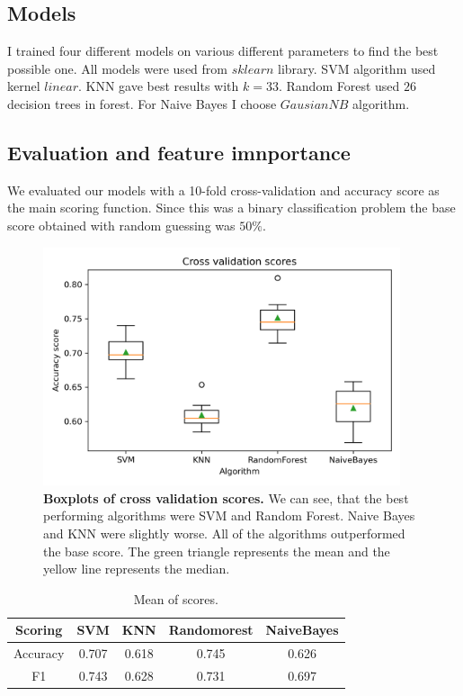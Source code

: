 \documentclass[fleqn,moreauthors,10pt]{ds_report}
\begin{document}
\subsection{Models}
I trained four different models on various different parameters to find the best possible one. All models were used from $sklearn$ library. SVM algorithm used kernel $linear$. KNN gave best results with $k=33$. Random Forest used $26$ decision trees in forest. For Naive Bayes I choose $GausianNB$ algorithm.

\subsection{Evaluation and feature imnportance}
We evaluated our models with a 10-fold cross-validation and accuracy score as the main scoring function. Since this was a binary classification problem the base score obtained with random guessing was $50\%$.


\begin{figure}[h]\centering
	\includegraphics[width=\linewidth, height=7cm]{problem_1_boxplot.png}
	
	\caption{\textbf{Boxplots of cross validation scores.} We can see, that the best performing algorithms were SVM and Random Forest. Naive Bayes and KNN were slightly worse. All of the algorithms outperformed the base score.  The green triangle represents the mean and the yellow line represents the median. }
	\label{boxplot1}
\end{figure}


\begin{center}
\begin{table}
\caption{\label{table_1} Mean of scores.}

\begin{tabular}{|c|| c| c| c| c|} 
 \hline
 Scoring  & SVM & KNN & Randomorest  & NaiveBayes\\ 
 \hline\hline
 Accuracy & 0.707 & 0.618 &  0.745 & 0.626\\ 
 \hline
 F1 & 0.743 & 0.628 & 0.731 & 0.697 \\
 \hline
\end{tabular}
\end{table}
\end{center}
\end{document}
